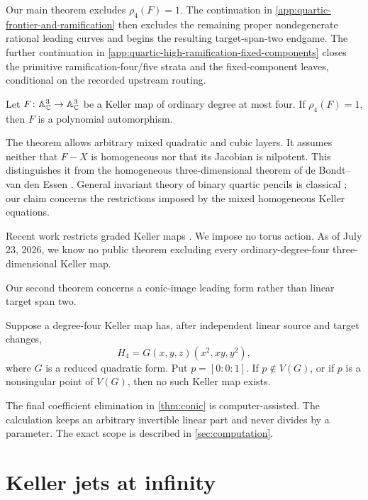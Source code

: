 \documentclass[11pt,reqno]{amsart}
\begin{document}
Our main theorem excludes \(\rho_4(F)=1\).  The continuation in
\cref{app:quartic-frontier-and-ramification} then excludes the remaining
proper nondegenerate rational leading curves and begins the resulting
target-span-two endgame.  The further continuation in
\cref{app:quartic-high-ramification-fixed-components} closes the primitive
ramification-four/five strata and the fixed-component leaves, conditional
on the recorded upstream routing.

\begin{theorem}
\label{thm:rank-one}
Let \(F\colon\mathbb A^3_{\mathbb C}\to\mathbb A^3_{\mathbb C}\) be a Keller map of ordinary degree at
most four.  If \(\rho_4(F)=1\), then \(F\) is a polynomial automorphism.
\end{theorem}

The theorem allows arbitrary mixed quadratic and cubic layers.  It assumes
neither that \(F-X\) is homogeneous nor that its Jacobian is nilpotent.  This
distinguishes it from the homogeneous three-dimensional theorem of de
Bondt--van den Essen \cite{deBondtVanDenEssen2005}.  General invariant theory
of binary quartic pencils is classical \cite{wall1998}; our claim concerns
the restrictions imposed by the mixed homogeneous Keller equations.

Recent work restricts graded Keller maps \cite{shaska2026graded}.  We impose
no torus action.  As of July 23, 2026, we know no public theorem excluding
every ordinary-degree-four three-dimensional Keller map.

Our second theorem concerns a conic-image leading form rather than linear
target span two.

\begin{theorem}
\label{thm:conic}
Suppose a degree-four Keller map has, after independent linear source and
target changes,
\[
H_4=G(x,y,z)(x^2,xy,y^2),
\]
where \(G\) is a reduced quadratic form.  Put \(p=[0:0:1]\).  If \(p\notin
V(G)\), or if \(p\) is a nonsingular point of \(V(G)\), then no such Keller
map exists.
\end{theorem}

The final coefficient elimination in \cref{thm:conic} is computer-assisted.
The calculation keeps an arbitrary invertible linear part and never divides
by a parameter.  The exact scope is described in
\cref{sec:computation}.

\section{Keller jets at infinity}
\label{sec:jets-at-infinity}
\end{document}
